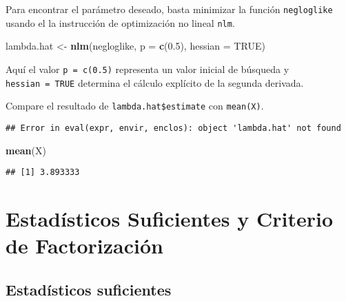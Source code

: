 \documentclass[
  12pt,
]{book}
\newenvironment{Shaded}{\begin{snugshade}}{\end{snugshade}}
\newcommand{\DataTypeTok}[1]{\textcolor[rgb]{0.13,0.29,0.53}{#1}}
\newcommand{\FloatTok}[1]{\textcolor[rgb]{0.00,0.00,0.81}{#1}}
\newcommand{\KeywordTok}[1]{\textcolor[rgb]{0.13,0.29,0.53}{\textbf{#1}}}
\newcommand{\NormalTok}[1]{#1}
\newcommand{\OperatorTok}[1]{\textcolor[rgb]{0.81,0.36,0.00}{\textbf{#1}}}
\newcommand{\OtherTok}[1]{\textcolor[rgb]{0.56,0.35,0.01}{#1}}
\newcommand{\StringTok}[1]{\textcolor[rgb]{0.31,0.60,0.02}{#1}}
\begin{document}
Para encontrar el parámetro deseado, basta minimizar la función \texttt{negloglike} usando el la instrucción de optimización no lineal \texttt{nlm}.

\begin{Shaded}
\begin{Highlighting}[]
\NormalTok{lambda.hat \textless{}{-}}\StringTok{ }\KeywordTok{nlm}\NormalTok{(negloglike, }\DataTypeTok{p =} \KeywordTok{c}\NormalTok{(}\FloatTok{0.5}\NormalTok{), }\DataTypeTok{hessian =} \OtherTok{TRUE}\NormalTok{)}
\end{Highlighting}
\end{Shaded}

Aquí el valor \texttt{p\ =\ c(0.5)} representa un valor inicial de búsqueda y \texttt{hessian\ =\ TRUE} determina el cálculo explícito de la segunda derivada.

Compare el resultado de \texttt{lambda.hat\$estimate} con \texttt{mean(X)}.

\begin{Shaded}
\end{Shaded}

\begin{verbatim}
## Error in eval(expr, envir, enclos): object 'lambda.hat' not found
\end{verbatim}

\begin{Shaded}
\begin{Highlighting}[]
\KeywordTok{mean}\NormalTok{(X)}
\end{Highlighting}
\end{Shaded}

\begin{verbatim}
## [1] 3.893333
\end{verbatim}

\hypertarget{estaduxedsticos-suficientes-y-criterio-de-factorizaciuxf3n}{%
\chapter{Estadísticos Suficientes y Criterio de Factorización}\label{estaduxedsticos-suficientes-y-criterio-de-factorizaciuxf3n}}

\hypertarget{estaduxedsticos-suficientes}{%
\section{Estadísticos suficientes}\label{estaduxedsticos-suficientes}}
\end{document}
